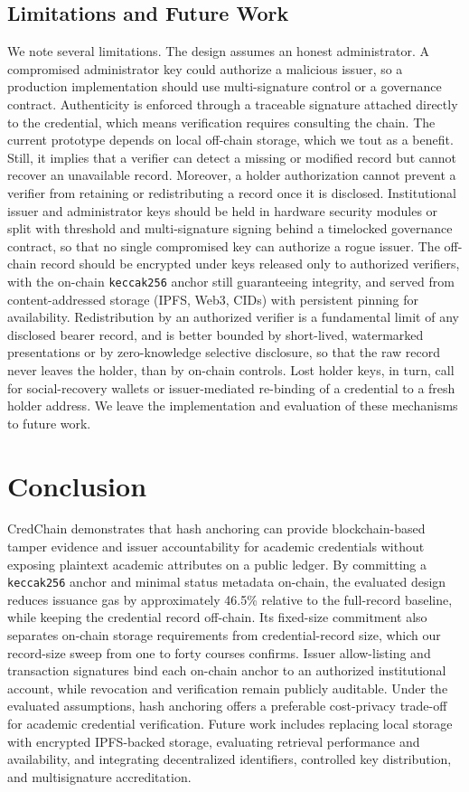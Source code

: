 \documentclass[conference]{IEEEtran}
\begin{document}
\subsection{Limitations and Future Work}
We note several limitations. The design assumes an honest administrator. A compromised administrator key could authorize a malicious issuer, so a production implementation should use multi-signature control or a governance contract. Authenticity is enforced through a traceable signature attached directly to the credential, which means verification requires consulting the chain. The current prototype depends on local off-chain storage, which we tout as a benefit. Still, it implies that a verifier can detect a missing or modified record but cannot recover an unavailable record. Moreover, a holder authorization cannot prevent a verifier from retaining or redistributing a record once it is disclosed. Institutional issuer and administrator keys should be held in hardware security modules or split with threshold and multi-signature signing behind a timelocked governance contract, so that no single compromised key can authorize a rogue issuer. The off-chain record should be encrypted under keys released only to authorized verifiers, with the on-chain \verb|keccak256| anchor still guaranteeing integrity, and served from content-addressed storage (IPFS, Web3, CIDs) with persistent pinning for availability. Redistribution by an authorized verifier is a fundamental limit of any disclosed bearer record, and is better bounded by short-lived, watermarked presentations or by zero-knowledge selective disclosure, so that the raw record never leaves the holder, than by on-chain controls. Lost holder keys, in turn, call for social-recovery wallets or issuer-mediated re-binding of a credential to a fresh holder address. We leave the implementation and evaluation of these mechanisms to future work. 

\section{Conclusion}
CredChain demonstrates that hash anchoring can provide blockchain-based tamper evidence and issuer accountability for academic credentials without exposing plaintext academic attributes on a public ledger. By committing a \verb|keccak256| anchor and minimal status metadata on-chain, the evaluated design reduces issuance gas by approximately 46.5\% relative to the full-record baseline, while keeping the credential record off-chain. Its fixed-size commitment also separates on-chain storage requirements from credential-record size, which our record-size sweep from one to forty courses confirms. Issuer allow-listing and transaction signatures bind each on-chain anchor to an authorized institutional account, while revocation and verification remain publicly auditable. Under the evaluated assumptions, hash anchoring offers a preferable cost-privacy trade-off for academic credential verification. Future work includes replacing local storage with encrypted IPFS-backed storage, evaluating retrieval performance and availability, and integrating decentralized identifiers, controlled key distribution, and multisignature accreditation.



\end{document}
